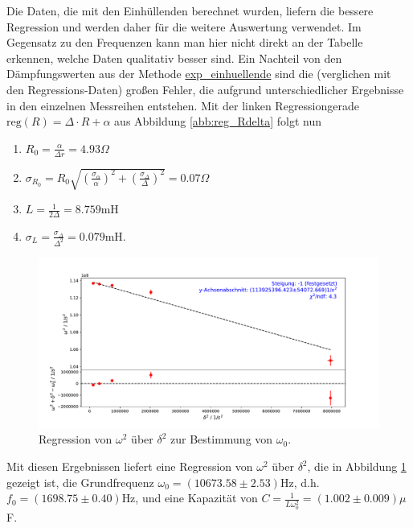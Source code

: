 \documentclass[a4paper, 12pt]{scrartcl}
\begin{document}
Die Daten, die mit den Einhüllenden berechnet wurden, liefern die bessere Regression und werden daher für die weitere Auswertung verwendet. Im Gegensatz zu den Frequenzen kann man hier nicht direkt an der Tabelle erkennen, welche Daten qualitativ besser sind. Ein Nachteil von den Dämpfungswerten aus der Methode \url{exp_einhuellende} sind die (verglichen mit den Regressions-Daten) großen Fehler, die aufgrund unterschiedlicher Ergebnisse in den einzelnen Messreihen entstehen. Mit der linken Regressiongerade $\text{reg}(R) = \Delta \cdot R + \alpha$ aus Abbildung \ref{abb:reg_Rdelta} folgt nun
\begin{enumerate}[-]
\item $R_0 = \frac{\alpha}{\Delta r} = 4.93 \Omega$
\item $\sigma_{R_0} = R_0 \sqrt{\left(\frac{\sigma_\alpha}{\alpha}\right)^2 + \left(\frac{\sigma_\Delta}{\Delta}\right)^2} = 0.07 \Omega$
\item $L = \frac{1}{2\Delta} = 8.759$mH
\item $\sigma_{L} = \frac{\sigma_\Delta}{\Delta^2} = 0.079$mH.
\end{enumerate}

\begin{figure}[H]
\centering
\includegraphics[width=\textwidth]{plots/reg_delomega.pdf}
\caption{Regression von $\omega^2$ über $\delta^2$ zur Bestimmung von $\omega_0$.}
\label{abb:reg_delomega}
\end{figure}


Mit diesen Ergebnissen liefert eine Regression von $\omega^2$ über $\delta^2$, die in Abbildung \ref{abb:reg_delomega} gezeigt ist, die Grundfrequenz $\omega_0 = (10673.58\pm 2.53)$Hz, d.h. $f_0 = (1698.75\pm 0.40)$Hz, und eine Kapazität von $C = \frac{1}{L\omega_0^2} = (1.002\pm 0.009)\mu$F. 
\end{document}
